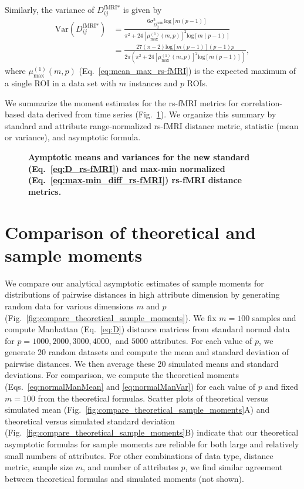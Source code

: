 \documentclass[10pt,letterpaper]{article}
\begin{document}
Similarly, the variance of $D^\text{fMRI*}_{ij}$ is given by
%
\begin{equation}\label{eq:var_max-min_rs-fMRI}
\begin{aligned}
\text{Var}\left(D^\text{fMRI*}_{ij}\right) &= \frac{6\sigma^2_{D^\text{fMRI}_{ij}}\text{log}[m(p-1)]}{\pi^2 + 24\left[\mu^{(1)}_\text{max}(m,p)\right]^2\text{log}[m(p-1)]} \\
&= \frac{27(\pi-2)\text{log}[m(p-1)](p-1)p}{2\pi\left(\pi^2 + 24\left[\mu^{(1)}_\text{max}(m,p)\right]^2\text{log}[m(p-1)]\right)},
\end{aligned}
\end{equation}
%
where $\mu^{(1)}_\text{max}(m,p)$ (Eq.~\ref{eq:mean_max_rs-fMRI}) is the expected maximum of a single ROI in a data set with $m$ instances and $p$ ROIs.

We summarize the moment estimates for the rs-fMRI metrics for correlation-based data derived from time series (Fig.~\ref{tab:dist_distr_rs-fMRI}). We organize this summary by standard and attribute range-normalized rs-fMRI distance metric, statistic (mean or variance), and asymptotic formula.


\begin{figure}[H]
	\centering
	\caption{{\bf Aymptotic means and variances for the new standard (Eq.~\ref{eq:D_rs-fMRI}) and max-min normalized (Eq.~\ref{eq:max-min_diff_rs-fMRI}) rs-fMRI distance metrics.}}
	\label{tab:dist_distr_rs-fMRI}
\end{figure}

\section*{Comparison of theoretical and sample moments}

We compare our analytical asymptotic estimates of sample moments for distributions of pairwise distances in high attribute dimension by generating random data for various dimensions $m$ and $p$ (Fig.~\ref{fig:compare_theoretical_sample_moments}). We fix $m=100$ samples and compute Manhattan (Eq.~\ref{eq:D}) distance matrices from standard normal data for $p=1000,2000,3000,4000,$ and $5000$ attributes. For each value of $p$, we generate 20 random datasets and compute the mean and standard deviation of pairwise distances. We then average these 20 simulated means and standard deviations. For comparison, we compute the theoretical moments (Eqs.~\ref{eq:normalManMean} and \ref{eq:normalManVar}) for each value of $p$ and fixed $m=100$ from the theoretical formulas. Scatter plots of theoretical versus simulated mean (Fig.~\ref{fig:compare_theoretical_sample_moments}A) and theoretical versus simulated standard deviation (Fig.~\ref{fig:compare_theoretical_sample_moments}B) indicate that our theoretical asymptotic formulas for sample moments are reliable for both large and relatively small numbers of attributes. For other combinations of data type, distance metric, sample size $m$, and number of attributes $p$, we find similar agreement between theoretical formulas and simulated moments (not shown).
\end{document}
